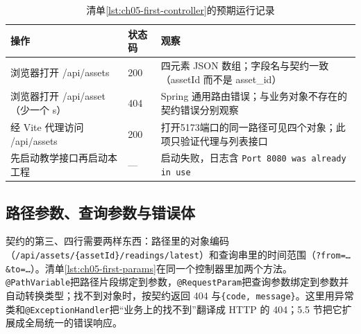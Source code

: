 \begin{table}[htbp]
\centering
\caption{清单\ref{lst:ch05-first-controller}的预期运行记录}
\label{tab:ch05-first-run}
\begin{tabular}{p{}p{}p{}}
\toprule
操作 & 状态码 & 观察 \\
\midrule
浏览器打开 /api/assets & 200 & 四元素 JSON 数组；字段名与契约一致（assetId 而不是 asset\_id） \\
浏览器打开 /api/asset（少一个 s） & 404 & Spring 通用路由错误；与业务对象不存在的契约错误分别观察 \\
经 Vite 代理访问 /api/assets & 200 & 打开5173端口的同一路径可见四个对象；此项只验证代理与列表接口 \\
先启动教学接口再启动本工程 & — & 启动失败，日志含 \texttt{Port 8080 was already in use} \\
\bottomrule
\end{tabular}
\end{table}

\subsection{路径参数、查询参数与错误体}

契约的第三、四行需要两样东西：路径里的对象编码（\texttt{/api/assets/}\allowbreak\texttt{\{assetId\}/}\allowbreak\texttt{readings/latest}）和查询串里的时间范围（\texttt{?from=…\&to=…}）。清单\ref{lst:ch05-first-params}在同一个控制器里加两个方法。\texttt{@PathVariable}把路径片段绑定到参数，\texttt{@RequestParam}把查询参数绑定到参数并自动转换类型；找不到对象时，按契约返回 404 与\texttt{\{code, message\}}。这里用异常类和\texttt{@ExceptionHandler}把“业务上的找不到”翻译成 HTTP 的 404；5.5 节把它扩展成全局统一的错误响应。

